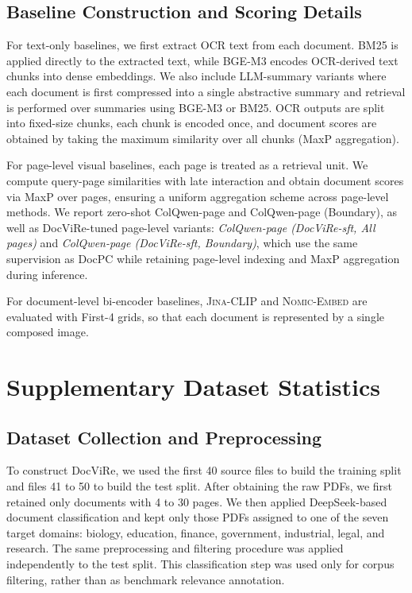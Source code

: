 \subsection{Baseline Construction and Scoring Details}
\label{sec:app-baselines}

For text-only baselines, we first extract OCR text from each document. \textsc{BM25} is applied directly to the extracted text, while \textsc{BGE-M3} encodes OCR-derived text chunks into dense embeddings. We also include LLM-summary variants where each document is first compressed into a single abstractive summary and retrieval is performed over summaries using \textsc{BGE-M3} or \textsc{BM25}. OCR outputs are split into fixed-size chunks, each chunk is encoded once, and document scores are obtained by taking the maximum similarity over all chunks (MaxP aggregation).

For page-level visual baselines, each page is treated as a retrieval unit. We compute query-page similarities with late interaction and obtain document scores via MaxP over pages, ensuring a uniform aggregation scheme across page-level methods. We report zero-shot ColQwen-page and ColQwen-page (Boundary), as well as DocViRe-tuned page-level variants: \emph{ColQwen-page (DocViRe-sft, All pages)} and \emph{ColQwen-page (DocViRe-sft, Boundary)}, which use the same supervision as DocPC while retaining page-level indexing and MaxP aggregation during inference.

For document-level bi-encoder baselines, \textsc{Jina-CLIP} and \textsc{Nomic-Embed} are evaluated with First-4 grids, so that each document is represented by a single composed image.

\section{Supplementary Dataset Statistics}
\label{sec:appendix-dataset}

\subsection{Dataset Collection and Preprocessing}
To construct DocViRe, we used the first 40 source files to build the training split and files 41 to 50 to build the test split. After obtaining the raw PDFs, we first retained only documents with 4 to 30 pages. We then applied DeepSeek-based document classification and kept only those PDFs assigned to one of the seven target domains: biology, education, finance, government, industrial, legal, and research. The same preprocessing and filtering procedure was applied independently to the test split. This classification step was used only for corpus filtering, rather than as benchmark relevance annotation.

